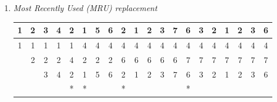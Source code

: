 \documentclass[letterpaper,11pt]{article}
\begin{document}
\begin{enumerate}
\begin{enumerate}
\begin{center}
  \begin{tabular}{ | r   | r   | r   | r   | r   | r   | r   | r   | r   | r   | r   | r   | r   | r   | r   | r   | r   | r   | r   | r   | }
  \hline
                     1     & 2     & 3     & 4     & 2     & 1     & 5     & 6     & 2     & 1     & 2     & 3     & 7     & 6     & 3     &     2 &   1   & 2     & 3     & 6     \\ \hline 
                     $\cellcolor{blue!25}1^1$ & $\cellcolor{blue!25}1^1$ & $\cellcolor{blue!25}1^1$ & $4^1$ & $4^1$ & $\cellcolor{blue!25}4^1$ & $4^0$ & $6^1$ & $\cellcolor{blue!25}6^1$ & $6^1$ & $6^1$ & $\cellcolor{blue!25} 6^0$ & $7^1$ & $7^1$ & $7^1$ & $\cellcolor{blue!25}7^0$ & $1^1$ & $1^1$ & $1^1$ & $\cellcolor{blue!25}1^0$ \\
                           & $2^1$ & $2^1$ & $\cellcolor{blue!25}2^0$ & $\cellcolor{blue!25}2^1$ & $2^0$ & $5^1$ & $\cellcolor{blue!25}5^1$ & $5^0$ & $1^1$ & $1^1$ & $1^0$ & $\cellcolor{blue!25}1^0$ & $6^1$ & $6^1$ & $6^0$ & $\cellcolor{blue!25}6^0$ & $\cellcolor{blue!25}6^0$ & $3^1$ & $3^0$ \\ 
                           &       & $3^1$ & $3^0$ & $3^0$ & $1^1$ & $\cellcolor{blue!25}1^1$ & $1^0$ & $2^1$ & $\cellcolor{blue!25}2^1$ & $\cellcolor{blue!25}2^1$ & $3^1$ & $3^1$ & $\cellcolor{blue!25}3^1$ & $\cellcolor{blue!25}3^1$ & $2^1$ & $2^1$ & $2^1$ & $\cellcolor{blue!25}2^1$ & $6^1$ \\ \hline
                           &       &       &       & *     &       &       &       &       &       & *     &       &       &       & *     &       &       & *     &       &       \\ \hline
  \end{tabular}
\end{center}

16 page faults occured.
    \item \emph{Most Recently Used (MRU) replacement}

\begin{center}
  \begin{tabular}{ | c | c | c | c | c | c | c | c | c | c | c | c | c | c | c | c | c | c | c | c | }
  \hline
                     1 & 2 & 3 & 4 & 2 & 1 & 5 & 6 & 2 & 1 & 2 & 3 & 7 & 6 & 3 & 2 & 1 & 2 & 3 & 6 \\ \hline 
                     1 & 1 & 1 & 1 & 1 & 4 & 4 & 4 & 4 & 4 & 4 & 4 & 4 & 4 & 4 & 4 & 4 & 4 & 4 & 4 \\
                       & 2 & 2 & 2 & 4 & 2 & 2 & 2 & 6 & 6 & 6 & 6 & 6 & 7 & 7 & 7 & 7 & 7 & 7 & 7 \\ 
                       &   & 3 & 4 & 2 & 1 & 5 & 6 & 2 & 1 & 2 & 3 & 7 & 6 & 3 & 2 & 1 & 2 & 3 & 6 \\ \hline
                       &   &   &   & * & * &   &   & * &   &   &   &   & * &   &   &   &   &   &   \\ \hline
  \end{tabular}
\end{center}


\end{enumerate}
\end{enumerate}
\end{document}
